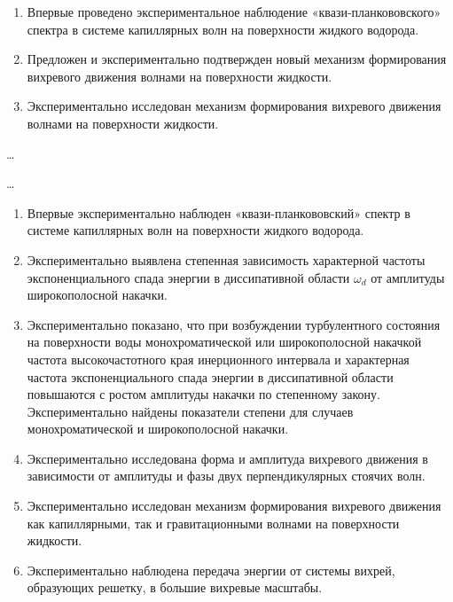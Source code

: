 {\novelty}
\begin{enumerate}
	\item Впервые проведено экспериментальное наблюдение «квази-планкововского» спектра в системе капиллярных волн на поверхности жидкого водорода.
	\item Предложен и экспериментально подтвержден новый механизм формирования вихревого движения волнами на поверхности жидкости.
	\item Экспериментально исследован механизм формирования вихревого движения волнами на поверхности жидкости.
	
\end{enumerate}

{\influence} \ldots

{\methods} \ldots


{}
\begin{enumerate}
	\item Впервые экспериментально наблюден «квази-планкововский» спектр в системе капиллярных волн на поверхности жидкого водорода.
	\item Экспериментально выявлена степенная зависимость характерной частоты экспоненциального спада энергии в диссипативной области $\omega_d$ от амплитуды широкополосной накачки.
	\item Экспериментально показано, что при возбуждении турбулентного состояния на поверхности воды монохроматической или широкополосной накачкой частота высокочастотного края инерционного интервала и характерная частота экспоненциального спада энергии в диссипативной области повышаются с ростом амплитуды накачки по степенному закону. Экспериментально найдены показатели степени для случаев монохроматической и широкополосной накачки.

	\item Экспериментально исследована форма и амплитуда вихревого движения в зависимости от амплитуды и фазы двух перпендикулярных стоячих волн.
	\item Экспериментально исследован механизм формирования вихревого движения как капиллярными, так и гравитационными волнами на поверхности жидкости.
	\item Экспериментально наблюдена передача энергии от системы вихрей, образующих решетку, в большие вихревые масштабы.
\end{enumerate}

